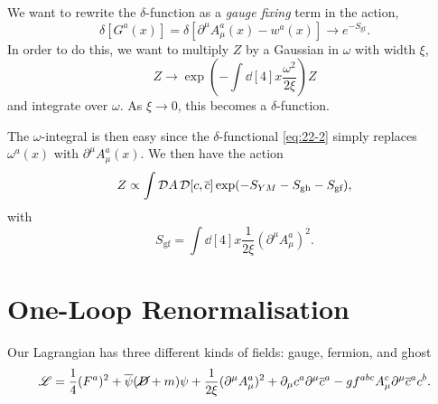 We want to rewrite the $\delta$-function as a \emph{gauge fixing} term in the action,
\begin{equation}
  \label{eq:22-2}
  \delta[G^{a}(x)] = \delta[\partial^{\mu} A_{\mu}^{a}(x) - w^{a}(x)] \to e^{-S_{\text{gf}}}.
\end{equation}
In order to do this, we want to multiply $Z$ by a Gaussian in $\omega$ with width $\xi$,
\begin{equation}
  Z \to \exp(-\int \dd[4]{x} \frac{\omega^2}{2 \xi}) Z
\end{equation}
and integrate over $\omega$. As $\xi \to 0$, this becomes a $\delta$-function.

The $\omega$-integral is then easy since the $\delta$-functional \eqref{eq:22-2} simply replaces $\omega^{a}(x)$ with $\partial^{\mu} A_{\mu}^{a}(x)$.
We then have the action
\begin{equation}
  Z \propto \int \mathop{\mathcal{D} A} \mathop{\mathcal{D} [c, \overline{c}{}]} \exp(-S_{YM} - S_{\text{gh}} - S_{\text{gf}}),
\end{equation}
with
\begin{equation}
  S_{\text{gf}} = \int \dd[4]{x} \frac{1}{2 \xi} (\partial^{\mu} A_{\mu}^{a})^2.
\end{equation}

\section{One-Loop Renormalisation}%
\label{sec:one_loop_renormalisation}

Our Lagrangian has three different kinds of fields: gauge, fermion, and ghost
\begin{equation}
  \mathscr{L} = \frac{1}{4} (F^{a})^2 + \overline{\psi}{} (\cancel{D} + m) \psi + \frac{1}{2 \xi} (\partial^{\mu} A_{\mu}^{a}) ^2 + \partial_{\mu} c^{a} \partial^{\mu} \overline{c}{}^{a} - g f^{abc} A_{\mu}^{c} \partial^{\mu} \overline{c}{}^{a} c^{b}.
\end{equation}

